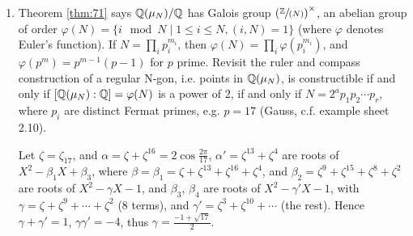 \begin{enumerate}
\item Theorem \ref{thm:71} says $\mathbb{Q}(\mathbf{\mu}_{N})/\mathbb{Q}$ has Galois group $\left(\sfrac{\mathbb{Z}}{(N)}\right)^{\times}$, an abelian group of order $\varphi(N) = \{ i \mod N \mid 1 \leq i \leq N, (i, N) = 1 \}$ (where $\varphi$ denotes Euler's function). If $N = \prod_i p_i^{m_i}$, then $\varphi(N) = \prod_i \varphi(p_i^{m_i})$, and $\varphi(p^m) = p^{m-1}(p-1)$ for $p$ prime. Revisit the ruler and compass construction of a regular N-gon, i.e. points in $\mathbb{Q}(\mathbf{\mu}_{N})$, is constructible if and only if $[\mathbb{Q}(\mathbf{\mu}_{N}) : \mathbb{Q}] = \varphi(N)$ is a power of 2, if and only if $N = 2^ap_1p_2\cdots{}p_r$, where $p_i$ are distinct Fermat primes, e.g. $p = 17$ (Gauss, c.f. example sheet 2.10).
  \begin{figure}[H]
    \centering
  \end{figure}
Let $\zeta = \zeta_{17}$, and $\alpha = \zeta + \zeta^{16} = 2\cos \frac{2\pi}{17}$, $\alpha' = \zeta^{13} + \zeta^4$ are roots of $X^2 -\beta_1X + \beta_3$, where $\beta = \beta_1 = \zeta + \zeta^{13} + \zeta^{16} + \zeta^4$, and $\beta_2 = \zeta^9 + \zeta^{15} + \zeta^8 + \zeta^2$ are roots of $X^2  -\gamma{}X - 1$, and $\beta_3$, $\beta_4$ are roots of $X^2 -\gamma'X-1$, with $\gamma = \zeta + \zeta^9 + \cdots + \zeta^2$ (8 terms), and $\gamma' = \zeta^3 + \zeta^{10} + \cdots$ (the rest). Hence $\gamma + \gamma' = 1$, $\gamma\gamma' = -4$, thus $\gamma = \frac{-1 + \sqrt{17}}{2}$.
\end{enumerate}


